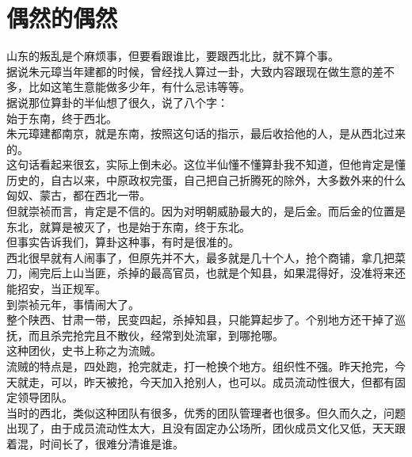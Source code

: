 \section{偶然的偶然}
\ifnum{}
	\begin{multicols}{\theparacolNo}
\fi
山东的叛乱是个麻烦事，但要看跟谁比，要跟西北比，就不算个事。\\

据说朱元璋当年建都的时候，曾经找人算过一卦，大致内容跟现在做生意的差不多，比如这笔生意能做多少年，有什么忌讳等等。\\

据说那位算卦的半仙想了很久，说了八个字：\\

始于东南，终于西北。\\

朱元璋建都南京，就是东南，按照这句话的指示，最后收拾他的人，是从西北过来的。\\

这句话看起来很玄，实际上倒未必。这位半仙懂不懂算卦我不知道，但他肯定是懂历史的，自古以来，中原政权完蛋，自己把自己折腾死的除外，大多数外来的什么匈奴、蒙古，都在西北一带。\\

但就崇祯而言，肯定是不信的。因为对明朝威胁最大的，是后金。而后金的位置是东北，就算是被灭了，也是始于东南，终于东北。\\

但事实告诉我们，算卦这种事，有时是很准的。\\

西北很早就有人闹事了，但原先并不大，最多就是几十个人，抢个商铺，拿几把菜刀，闹完后上山当匪，杀掉的最高官员，也就是个知县，如果混得好，没准将来还能招安，当正规军。\\

到崇祯元年，事情闹大了。\\

整个陕西、甘肃一带，民变四起，杀掉知县，只能算起步了。个别地方还干掉了巡抚，而且杀完抢完且不散伙，经常到处流窜，到哪抢哪。\\

这种团伙，史书上称之为流贼。\\

流贼的特点是，四处跑，抢完就走，打一枪换个地方。组织性不强。昨天抢完，今天就走，可以，昨天被抢，今天加入抢别人，也可以。成员流动性很大，但都有固定领导团队。\\

当时的西北，类似这种团队有很多，优秀的团队管理者也很多。但久而久之，问题出现了，由于成员流动性太大，且没有固定办公场所，团伙成员文化又低，天天跟着混，时间长了，很难分清谁是谁。\\


\end{multicols}
